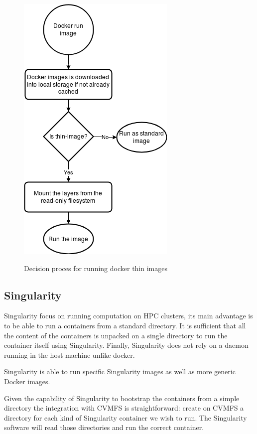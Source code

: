 \begin{figure}
\includegraphics{gfx/RunThinImages}
\label{fig:flowchart-run-thin-image}
\caption{Decision proces for running docker thin images}
\end{figure}

\subsection{Singularity}

Singularity focus on running computation on HPC clusters, its main advantage is
to be able to run a containers from a standard directory. It is sufficient that
all the content of the containers is unpacked on a single directory to run the
container itself using Singularity. Finally, Singularity does not rely on a
daemon running in the host machine unlike docker.

Singularity is able to run specific Singularity images as well as more generic
Docker images.

Given the capability of Singularity to bootstrap the containers from a simple
directory the integration with CVMFS is straightforward: create on CVMFS a
directory for each kind of Singularity container we wish to run. The
Singularity software will read those directories and run the correct container.

